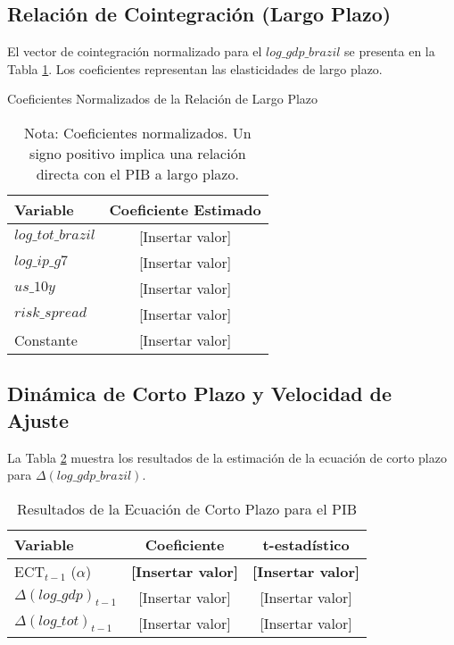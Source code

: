 \documentclass[12pt, a4paper]{article}
\begin{document}
\subsection{Relación de Cointegración (Largo Plazo)}
El vector de cointegración normalizado para el $log\_gdp\_brazil$ se presenta en la Tabla \ref{tab:long_run}. Los coeficientes representan las elasticidades de largo plazo.

\begin{table}[h!]
\centering
\caption{Coeficientes Normalizados de la Relación de Largo Plazo}
\label{tab:long_run}
\begin{tabular}{lc}
\toprule
\textbf{Variable} & \textbf{Coeficiente Estimado} \\
\midrule
$log\_tot\_brazil$ & [Insertar valor] \\
$log\_ip\_g7$      & [Insertar valor] \\
$us\_10y$          & [Insertar valor] \\
$risk\_spread$     & [Insertar valor] \\
Constante        & [Insertar valor] \\
\bottomrule
\end{tabular}
\caption*{Nota: Coeficientes normalizados. Un signo positivo implica una relación directa con el PIB a largo plazo.}
\end{table}


\subsection{Dinámica de Corto Plazo y Velocidad de Ajuste}
La Tabla \ref{tab:short_run} muestra los resultados de la estimación de la ecuación de corto plazo para $\Delta(log\_gdp\_brazil)$.

\begin{table}[h!]
\centering
\caption{Resultados de la Ecuación de Corto Plazo para el PIB}
\label{tab:short_run}
\begin{tabular}{lcc}
\toprule
\textbf{Variable} & \textbf{Coeficiente} & \textbf{t-estadístico} \\
\midrule
ECT$_{t-1}$ ($\alpha$) & \textbf{[Insertar valor]} & \textbf{[Insertar valor]} \\
$\Delta(log\_gdp)_{t-1}$ & [Insertar valor] & [Insertar valor] \\
$\Delta(log\_tot)_{t-1}$ & [Insertar valor] & [Insertar valor] \\
\bottomrule
\end{tabular}
\end{table}
\end{document}
